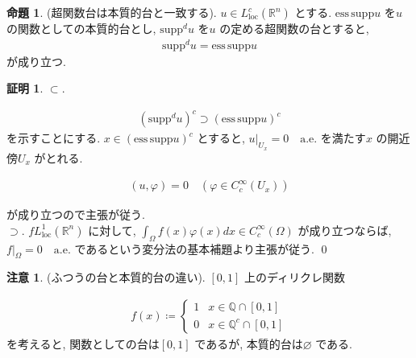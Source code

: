 \documentclass[10pt, fleqn, label-section=none]{bxjsarticle}
\theoremstyle{definition}
\newtheorem{prop}[dfn]{命題}
\newtheorem*{pf*}{証明}
\newtheorem{remark}[dfn]{注意}
\newcommand{\supp}{\textrm{supp}}
\renewcommand{\;}{\, ; \,}
\begin{document}
\begin{prop}(超関数台は本質的台と一致する). $u \in L_{\textrm{loc}}^c(\mathbb R^n)$ とする. $\textrm{ess}\, \supp u$ を$u$ の関数としての本質的台とし, $\supp^d u $ を$u$ の定める超関数の台とすると, 
\begin{align*} \supp^d u =  \textrm{ess}\, \supp u \end{align*}
が成り立つ. 
\end{prop}
\begin{pf*}$\subset$. 

\begin{align*}   (\supp^d u)^c \supset (\textrm{ess}\, \supp u)^c  \end{align*}
を示すことにする. $x \in (\textrm{ess}\, \supp u)^c$ とすると, $u|_{U_x} = 0 \quad \textrm{a.e.}$ を満たす$x$ の開近傍$U_x$ がとれる. 

\begin{align*} (u, \varphi) = 0 \quad (\varphi \in C_c^\infty(U_x))\end{align*}

が成り立つので主張が従う. \\
$\supset$. $f L_{\textrm{loc}}^1(\mathbb R^n)$ に対して, $\int_{\Omega } f(x)\varphi(x) dx \in C_c^\infty (\Omega )$ が成り立つならば, $f|_{\Omega} = 0 \quad \textrm{a.e.}$ であるという変分法の基本補題より主張が従う. 
\qed
\end{pf*}


\begin{remark}(ふつうの台と本質的台の違い). $[0,1]$ 上のディリクレ関数

\begin{align*} f(x) \coloneqq \begin{cases} 1 & x \in \mathbb Q \cap [0, 1] \\ 0 & x \in \mathbb Q^c \cap [0, 1] \end{cases} \end{align*}
を考えると, 関数としての台は$[0, 1]$ であるが, 本質的台は$\varnothing$ である. 
\end{remark}
\end{document}
